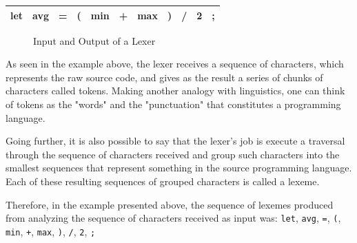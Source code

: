 \begin{figure}[H]
  \centering
\end{figure}

\begin{table}[H]
    \centering
    \begin{tabular}{|c|c|c|c|c|c|c|c|c|c|c|}
        \hline
        let & avg & = & ( & min & + & max & ) & / & 2 & ; \\
        \hline
    \end{tabular}
\end{table}

\begin{figure}[H]  
  \caption{Input and Output of a Lexer}
  \label{fig:lexer}
\end{figure}

As seen in the example above, the lexer receives a sequence of characters, which represents the raw source code, and gives as the result a series of chunks of characters called tokens. Making another analogy with linguistics, one can think of tokens as the "words" and  the "punctuation" that constitutes a programming language.

Going further, it is also possible to say that the lexer's job is execute a traversal through the sequence of characters received and group such characters into the smallest sequences that represent something in the source programming language. Each of these resulting sequences of grouped characters is called a lexeme.

Therefore, in the example presented above, the sequence of lexemes produced from analyzing the sequence of characters received as input was: \texttt{let}, \texttt{avg}, \texttt{=}, \texttt{(}, \texttt{min}, \texttt{+}, \texttt{max}, \texttt{)}, \texttt{/}, \texttt{2}, \texttt{;}

